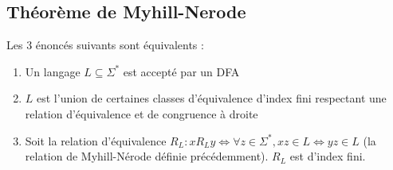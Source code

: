 \subsection{Théorème de Myhill-Nerode}
	
	\begin{theorem}
		Les 3 énoncés suivants sont équivalents :
		\begin{enumerate}
			\item Un langage $L\subseteq\Sigma^*$ est accepté par un DFA
			\item $L$ est l'union de certaines classes d'équivalence d'index fini respectant une relation d'équivalence et de congruence à droite
			\item Soit la relation d'équivalence $R_L : xR_Ly \Leftrightarrow \forall z \in \Sigma^*, xz \in L \Leftrightarrow yz \in L$ (la relation de Myhill-Nérode définie précédemment). $R_L$ est d'index fini.
		\end{enumerate}
	\end{theorem}
	
